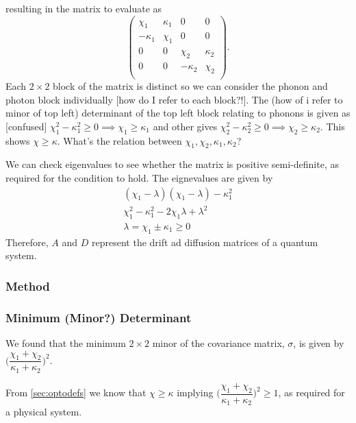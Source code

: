 \documentclass[11pt,a4paper]{article}
\numberwithin{equation}{section}
\begin{document}
	resulting in the matrix to evaluate as
	\begin{equation*}
		\begin{pmatrix}
		\chi_1 & \kappa_1 & 0 & 0 \\
		-\kappa_1 & \chi_1 & 0 & 0\\
		0 & 0 & \chi_2 & \kappa_2\\
		0 & 0 & -\kappa_2 & \chi_2\\
		\end{pmatrix}.
	\end{equation*}
	Each $2 \times 2$ block of the matrix is distinct so we can consider the phonon and photon block individually \color{red}[how do I refer to each block?!]\color{black}. The (how of i refer to minor of top left) determinant of the top left block relating to phonons is given as \color{blue}[confused] $\chi_{1}^2 - \kappa_{1}^2 \geq 0 \implies \chi_1 \geq \kappa_1$ and other gives $\chi_{2}^2 - \kappa_{2}^2 \geq 0 \implies \chi_2 \geq \kappa_2$. This shows $\chi \geq \kappa$. \color{red} What's the relation between $\chi_1, \chi_2, \kappa_1, \kappa_2$?\color{black}
	
	We can check eigenvalues to see whether the matrix is positive semi-definite, as required for the condition to hold. The eignevalues are given by
	\begin{align*}
	&(\chi_1- \lambda)(\chi_1- \lambda) - \kappa_{1}^2&\\
	&\chi_{1}^2 - \kappa_{1}^2 - 2\chi_{1}\lambda + \lambda^2&\\
	&\lambda = \chi_1 \pm \kappa_1 \geq 0& \tag*{as $\chi_1 \geq \kappa_1$.}
	\end{align*}
	Therefore, $A$ and $D$ represent the drift ad diffusion matrices of a quantum system.
	
	\color{red}\subsubsection{Method}\color{black}

	\subsubsection{Minimum (Minor?) Determinant}
	We found that the minimum $2 \times 2$ minor of the covariance matrix, $\sigma$, is given by $\Big(\dfrac{\chi_1 + \chi_2}{\kappa_1 + \kappa_2}\Big)^2$.  
	
	From \ref{sec:optodefs} we know that $\chi \geq \kappa$ implying $\Big(\dfrac{\chi_1 + \chi_2}{\kappa_1 + \kappa_2}\Big)^2 \geq 1$, as required for a physical system. 
	
\end{document}
